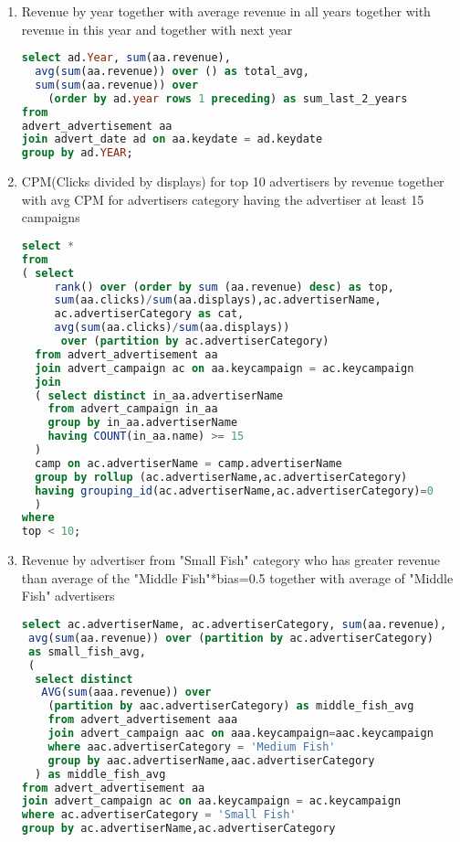 \begin{enumerate}
\item    Revenue by year together with average revenue in all years together with revenue in this year and together with next year
\begin{lstlisting}[language=sql] 
select ad.Year, sum(aa.revenue), 
  avg(sum(aa.revenue)) over () as total_avg,
  sum(sum(aa.revenue)) over 
    (order by ad.year rows 1 preceding) as sum_last_2_years
from   
advert_advertisement aa
join advert_date ad on aa.keydate = ad.keydate
group by ad.YEAR;
\end{lstlisting}
\item    CPM(Clicks divided by displays) for top 10 advertisers by revenue together with avg CPM for advertisers category having the advertiser at least 15 campaigns
\begin{lstlisting}[language=sql] 
select *
from 
( select
     rank() over (order by sum (aa.revenue) desc) as top,
     sum(aa.clicks)/sum(aa.displays),ac.advertiserName,
     ac.advertiserCategory as cat, 
     avg(sum(aa.clicks)/sum(aa.displays)) 
      over (partition by ac.advertiserCategory)
  from advert_advertisement aa
  join advert_campaign ac on aa.keycampaign = ac.keycampaign
  join
  ( select distinct in_aa.advertiserName 
    from advert_campaign in_aa
    group by in_aa.advertiserName
    having COUNT(in_aa.name) >= 15
  )
  camp on ac.advertiserName = camp.advertiserName
  group by rollup (ac.advertiserName,ac.advertiserCategory) 
  having grouping_id(ac.advertiserName,ac.advertiserCategory)=0
  )
where 
top < 10;
\end{lstlisting}
\item Revenue by advertiser from "Small Fish" category who has greater revenue than average of the "Middle Fish"*bias=0.5 together with average of "Middle Fish" advertisers  
  \begin{lstlisting}[language=sql] 
select ac.advertiserName, ac.advertiserCategory, sum(aa.revenue), 
 avg(sum(aa.revenue)) over (partition by ac.advertiserCategory) 
 as small_fish_avg,
 ( 
  select distinct
   AVG(sum(aaa.revenue)) over 
    (partition by aac.advertiserCategory) as middle_fish_avg
    from advert_advertisement aaa 
    join advert_campaign aac on aaa.keycampaign=aac.keycampaign
    where aac.advertiserCategory = 'Medium Fish'   
    group by aac.advertiserName,aac.advertiserCategory
  ) as middle_fish_avg
from advert_advertisement aa
join advert_campaign ac on aa.keycampaign = ac.keycampaign
where ac.advertiserCategory = 'Small Fish'
group by ac.advertiserName,ac.advertiserCategory

\end{lstlisting}
\end{enumerate}
